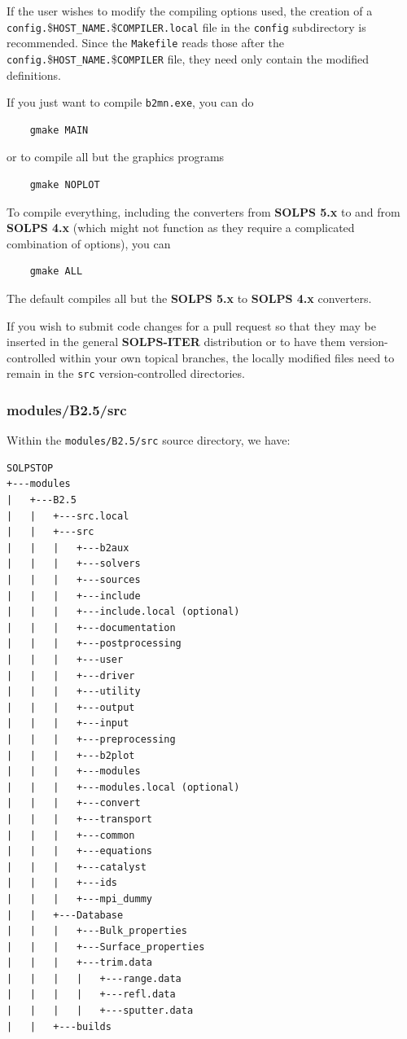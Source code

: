 \documentclass[a4paper,10pt]{report}
\newcommand\SOLPSfour{{\bf SOLPS 4.x} }
\newcommand\SOLPSfive{{\bf SOLPS 5.x} }
\newcommand\SOLPSITER{{\bf SOLPS-ITER} }
\begin{document}
If the user wishes to modify the compiling options used, the creation
of a {\tt config.}\${\tt {HOST\_NAME}.}\${\tt {COMPILER}.local} file in the
{\tt config} subdirectory is recommended. Since the {\tt Makefile}
reads those after the {\tt config.}\${\tt {HOST\_NAME}.\allowbreak}\${\tt {COMPILER}} file,
they need only contain the modified definitions.

If you just want to compile {\tt b2mn.exe}, you can do
\begin{verbatim}
    gmake MAIN
\end{verbatim}
or to compile all but the graphics programs
\begin{verbatim}
    gmake NOPLOT
\end{verbatim}
To compile everything, including the converters from \SOLPSfive to
and from \SOLPSfour (which might not function as they require a complicated
combination of options), you can
\begin{verbatim}
    gmake ALL
\end{verbatim}
The default compiles all but the \SOLPSfive to \SOLPSfour converters.

If you wish to submit code changes for a pull request so that they may be inserted in the
general \SOLPSITER distribution or to have them version-controlled within your own topical
branches, the locally modified files need to remain in the {\tt src}
version-controlled directories.

\newpage\subsubsection{modules/B2.5/src}

Within the {\tt modules/B2.5/src} source directory, we have:


\begin{verbatim}
SOLPSTOP
+---modules
|   +---B2.5
|   |   +---src.local
|   |   +---src
|   |   |   +---b2aux
|   |   |   +---solvers
|   |   |   +---sources
|   |   |   +---include
|   |   |   +---include.local (optional)
|   |   |   +---documentation
|   |   |   +---postprocessing
|   |   |   +---user
|   |   |   +---driver
|   |   |   +---utility
|   |   |   +---output
|   |   |   +---input
|   |   |   +---preprocessing
|   |   |   +---b2plot
|   |   |   +---modules
|   |   |   +---modules.local (optional)
|   |   |   +---convert
|   |   |   +---transport
|   |   |   +---common
|   |   |   +---equations
|   |   |   +---catalyst
|   |   |   +---ids
|   |   |   +---mpi_dummy
|   |   +---Database
|   |   |   +---Bulk_properties
|   |   |   +---Surface_properties
|   |   |   +---trim.data
|   |   |   |   +---range.data
|   |   |   |   +---refl.data
|   |   |   |   +---sputter.data
|   |   +---builds
\end{verbatim}
\end{document}
